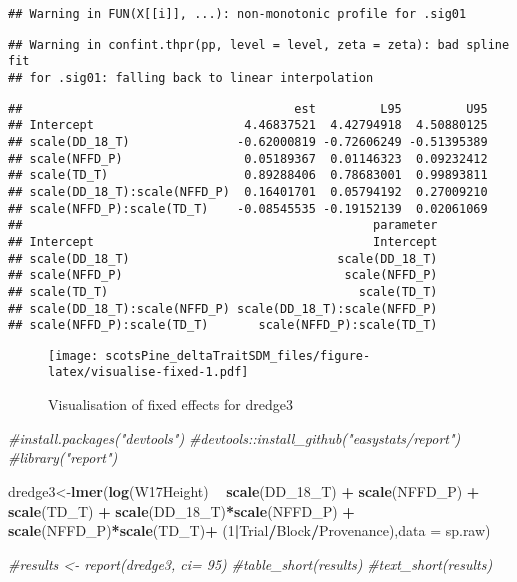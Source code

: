 \documentclass[]{article}
\newenvironment{Shaded}{\begin{snugshade}}{\end{snugshade}}
\newcommand{\KeywordTok}[1]{\textcolor[rgb]{0.13,0.29,0.53}{\textbf{#1}}}
\newcommand{\DataTypeTok}[1]{\textcolor[rgb]{0.13,0.29,0.53}{#1}}
\newcommand{\DecValTok}[1]{\textcolor[rgb]{0.00,0.00,0.81}{#1}}
\newcommand{\StringTok}[1]{\textcolor[rgb]{0.31,0.60,0.02}{#1}}
\newcommand{\CommentTok}[1]{\textcolor[rgb]{0.56,0.35,0.01}{\textit{#1}}}
\newcommand{\OperatorTok}[1]{\textcolor[rgb]{0.81,0.36,0.00}{\textbf{#1}}}
\newcommand{\NormalTok}[1]{#1}
\begin{document}
\begin{verbatim}
## Warning in FUN(X[[i]], ...): non-monotonic profile for .sig01
\end{verbatim}

\begin{verbatim}
## Warning in confint.thpr(pp, level = level, zeta = zeta): bad spline fit
## for .sig01: falling back to linear interpolation
\end{verbatim}

\begin{verbatim}
##                                      est         L95         U95
## Intercept                     4.46837521  4.42794918  4.50880125
## scale(DD_18_T)               -0.62000819 -0.72606249 -0.51395389
## scale(NFFD_P)                 0.05189367  0.01146323  0.09232412
## scale(TD_T)                   0.89288406  0.78683001  0.99893811
## scale(DD_18_T):scale(NFFD_P)  0.16401701  0.05794192  0.27009210
## scale(NFFD_P):scale(TD_T)    -0.08545535 -0.19152139  0.02061069
##                                                 parameter
## Intercept                                       Intercept
## scale(DD_18_T)                             scale(DD_18_T)
## scale(NFFD_P)                               scale(NFFD_P)
## scale(TD_T)                                   scale(TD_T)
## scale(DD_18_T):scale(NFFD_P) scale(DD_18_T):scale(NFFD_P)
## scale(NFFD_P):scale(TD_T)       scale(NFFD_P):scale(TD_T)
\end{verbatim}

\begin{figure}
\centering
\texttt{[image: scotsPine\_deltaTraitSDM\_files/figure-latex/visualise-fixed-1.pdf]}
\caption{Visualisation of fixed effects for dredge3}
\end{figure}

\begin{Shaded}
\begin{Highlighting}[]
\CommentTok{#install.packages("devtools")}
\CommentTok{#devtools::install_github("easystats/report")}
\CommentTok{#library("report")}

\NormalTok{dredge3<-}\KeywordTok{lmer}\NormalTok{(}\KeywordTok{log}\NormalTok{(W17Height) }\OperatorTok{~}\StringTok{ }\KeywordTok{scale}\NormalTok{(DD_18_T) }\OperatorTok{+}\StringTok{ }\KeywordTok{scale}\NormalTok{(NFFD_P) }\OperatorTok{+}\StringTok{ }\KeywordTok{scale}\NormalTok{(TD_T) }\OperatorTok{+}\StringTok{ }\KeywordTok{scale}\NormalTok{(DD_18_T)}\OperatorTok{*}\KeywordTok{scale}\NormalTok{(NFFD_P) }\OperatorTok{+}\StringTok{ }\KeywordTok{scale}\NormalTok{(NFFD_P)}\OperatorTok{*}\KeywordTok{scale}\NormalTok{(TD_T)}\OperatorTok{+}\StringTok{ }\NormalTok{(}\DecValTok{1}\OperatorTok{|}\NormalTok{Trial}\OperatorTok{/}\NormalTok{Block}\OperatorTok{/}\NormalTok{Provenance),}\DataTypeTok{data =}\NormalTok{ sp.raw)}

\CommentTok{#results <- report(dredge3, ci= 95)}
\CommentTok{#table_short(results)}
\CommentTok{#text_short(results)}
\end{Highlighting}
\end{Shaded}
\end{document}
